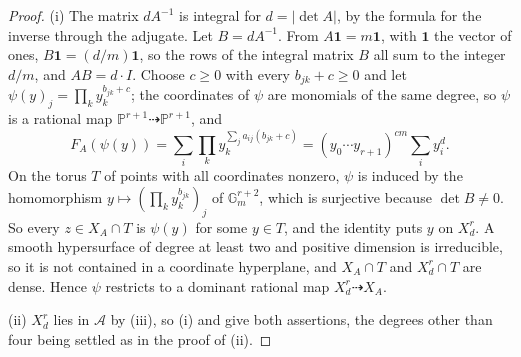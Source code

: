 \documentclass[11pt,reqno]{amsart}
\theoremstyle{plain}
\theoremstyle{definition}
\theoremstyle{remark}
\newcommand{\PP}{\mathbb{P}}
\begin{document}
\begin{proof}
(i) The matrix $dA^{-1}$ is integral for $d=|\det A|$, by the formula
for the inverse through the adjugate. Let $B=dA^{-1}$. From
$A\mathbf{1}=m\mathbf{1}$, with $\mathbf{1}$ the vector of ones,
$B\mathbf{1}=(d/m)\mathbf{1}$, so the rows of the integral matrix $B$ all
sum to the integer $d/m$, and $AB=d\cdot I$. Choose $c\ge0$
with every $b_{jk}+c\ge0$ and let $\psi(y)_{j}=\prod_{k}y_{k}^{b_{jk}+c}$;
the coordinates of $\psi$ are monomials of the same degree, so $\psi$ is a
rational map $\PP^{r+1}\dashrightarrow\PP^{r+1}$, and
\[
  F_{A}(\psi(y))=\sum_{i}\prod_{k}y_{k}^{\sum_{j}a_{ij}(b_{jk}+c)}
  =(y_{0}\cdots y_{r+1})^{cm}\sum_{i}y_{i}^{d}.
\]
On the torus $T$ of points with all coordinates nonzero, $\psi$ is induced
by the homomorphism $y\mapsto(\prod_{k}y_{k}^{b_{jk}})_{j}$ of
$\mathbb{G}_{m}^{r+2}$, which is surjective because $\det B\ne0$. So every
$z\in X_{A}\cap T$ is $\psi(y)$ for some $y\in T$, and the identity puts $y$
on $X^{r}_{d}$. A smooth hypersurface of degree at least two and positive
dimension is irreducible, so it is not contained in a coordinate hyperplane,
and $X_{A}\cap T$ and $X^{r}_{d}\cap T$ are dense. Hence $\psi$ restricts to
a dominant rational map $X^{r}_{d}\dashrightarrow X_{A}$.

(ii) $X^{r}_{d}$ lies in $\mathcal{A}$ by (iii), so (i)
and  give both assertions, the degrees other than
four being settled as in the proof of (ii).


\end{proof}
\end{document}
